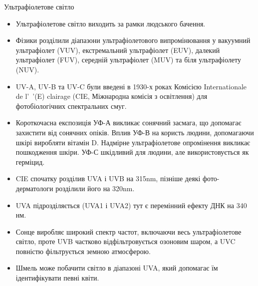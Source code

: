 {\Large Ультрафіолетове світло}
\begin{itemize}
\item Ультрафіолетове світло виходить за рамки людського бачення.

\item Фізики розділили діапазони ультрафіолетового випромінювання у вакуумний ультрафіолет (VUV), екстремальний ультрафіолет (EUV), далекий ультрафіолет (FUV), середній ультрафіолет (MUV) та біля ультрафіолету (NUV).

\item UV-A, UV-B та UV-C були введені в 1930-х роках Комісією Internationale de l'\ '(E) clairage (CIE, Міжнародна комісія з освітлення) для фотобіологічних спектральних смуг.

\item Короткочасна експозиція УФ-А викликає сонячний засмага, що допомагає захистити від сонячних опіків. Вплив УФ-В на користь людини, допомагаючи шкірі виробляти вітамін D. Надмірне ультрафіолетове опромінення викликає пошкодження шкіри. УФ-С шкідливий для людини, але використовується як герміцид.

\item CIE спочатку розділив UVA і UVB на 315nm, пізніше деякі фото-дерматологи розділили його на 320nm.

\item UVA підрозділяється (UVA1 і UVA2) тут є перемінний ефекту ДНК на 340 нм.

\item Сонце виробляє широкий спектр частот, включаючи весь ультрафіолетове світло, проте UVB частково відфільтровується озоновим шаром, а UVC повністю фільтрується земною атмосферою.

\item Шмель може побачити світло в діапазоні UVA, який допомагає їм ідентифікувати певні квіти.
\end{itemize}





